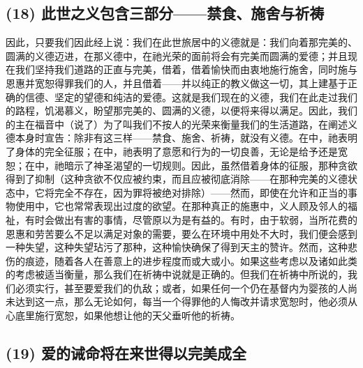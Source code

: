 
\subsection{(18) 此世之义包含三部分——禁食、施舍与祈祷}

因此，只要我们因此经上说：我们在此世旅居中的义德就是：我们向着那完美的、圆满的义德迈进，在那义德中，在祂光荣的面前将会有完美而圆满的爱德；并且现在我们坚持我们道路的正直与完美，借着，借着愉快而由衷地施行施舍，同时施与恩惠并宽恕得罪我们的人，并且借着——并以纯正的教义做这一切，其上建基于正确的信德、坚定的望德和纯洁的爱德。这就是我们现在的义德，我们在此走过我们的路程，饥渴慕义，盼望那完美的、圆满的义德，以便将来得以满足。因此，我们的主在福音中（说了）为了叫我们不按人的光荣来衡量我们的生活道路，在阐述义德本身时宣告：除非有这三样——禁食、施舍、祈祷，就没有义德。在中，祂表明了身体的完全征服；在中，祂表明了意愿和行为的一切良善，无论是给予还是宽恕；在中，祂暗示了神圣渴望的一切规则。因此，虽然借着身体的征服，那种贪欲得到了抑制（这种贪欲不仅应被约束，而且应被彻底消除——在那种完美的义德状态中，它将完全不存在，因为罪将被绝对排除）——然而，即使在允许和正当的事物使用中，它也常常表现出过度的欲望。在那种真正的施惠中，义人顾及邻人的福祉，有时会做出有害的事情，尽管原以为是有益的。有时，由于软弱，当所花费的恩惠和劳苦要么不足以满足对象的需要，要么在环境中用处不大时，我们便会感到一种失望，这种失望玷污了那种，这种愉快确保了得到天主的赞许。然而，这种悲伤的痕迹，随着各人在善意上的进步程度而或大或小。如果这些考虑以及诸如此类的考虑被适当衡量，那么我们在祈祷中说就是正确的。但我们在祈祷中所说的，我们必须实行，甚至要爱我们的仇敌；或者，如果任何一个仍在基督内为婴孩的人尚未达到这一点，那么无论如何，每当一个得罪他的人悔改并请求宽恕时，他必须从心底里施行宽恕，如果他想让他的天父垂听他的祈祷。\par


\subsection{(19) 爱的诫命将在来世得以完美成全}

